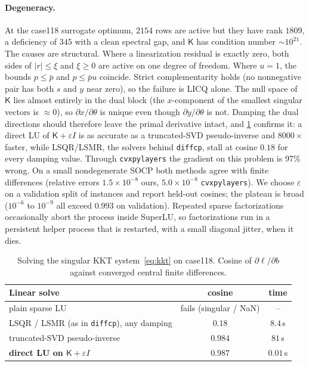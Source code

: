 \documentclass[10pt]{article}
\begin{document}
\paragraph{Degeneracy.} At the case118 surrogate optimum, $2154$ rows are active but they have rank $1809$, a deficiency of $345$ with a clean spectral gap, and $\mathsf K$ has condition number $\sim\!10^{21}$. The causes are structural. Where a linearization residual is exactly zero, both sides of $|r|\le\xi$ and $\xi\ge0$ are active on one degree of freedom. Where $u=1$, the bounds $p\le\bar p$ and $p\le\bar p u$ coincide. Strict complementarity holds (no nonnegative pair has both $s$ and $y$ near zero), so the failure is LICQ alone. The null space of $\mathsf K$ lies almost entirely in the dual block (the $x$-component of the smallest singular vectors is $\approx0$), so $\partial x/\partial\theta$ is unique even though $\partial y/\partial\theta$ is not. Damping the dual directions should therefore leave the primal derivative intact, and \cref{tab:linsolve} confirms it: a direct LU of $\mathsf K+\varepsilon I$ is as accurate as a truncated-SVD pseudo-inverse and $8000\times$ faster, while LSQR/LSMR, the solvers behind \texttt{diffcp}, stall at cosine $0.18$ for every damping value. Through \texttt{cvxpylayers} the gradient on this problem is 97\% wrong. On a small nondegenerate SOCP both methods agree with finite differences (relative errors $1.5\times10^{-8}$ ours, $5.0\times10^{-8}$ \texttt{cvxpylayers}). We choose $\varepsilon$ on a validation split of instances and report held-out cosines; the plateau is broad ($10^{-6}$ to $10^{-9}$ all exceed $0.993$ on validation).
Repeated sparse factorizations occasionally abort the process inside SuperLU, so factorizations run in a persistent helper process that is restarted, with a small diagonal jitter, when it dies.

\begin{table}[t]
\centering\small
\caption{Solving the singular KKT system~\eqref{eq:kkt} on case118. Cosine of $\partial\ell/\partial b$ against converged central finite differences.}
\label{tab:linsolve}
\begin{tabular}{@{}lcc@{}}
\toprule
Linear solve & cosine & time \\
\midrule
plain sparse LU & fails (singular / NaN) & -- \\
LSQR / LSMR (as in \texttt{diffcp}), any damping & $0.18$ & $8.4$\,s \\
truncated-SVD pseudo-inverse & $0.984$ & $81$\,s \\
\textbf{direct LU on $\mathsf K+\varepsilon I$} & $\mathbf{0.987}$ & $\mathbf{0.01}$\,s \\
\bottomrule
\end{tabular}
\end{table}
\end{document}
